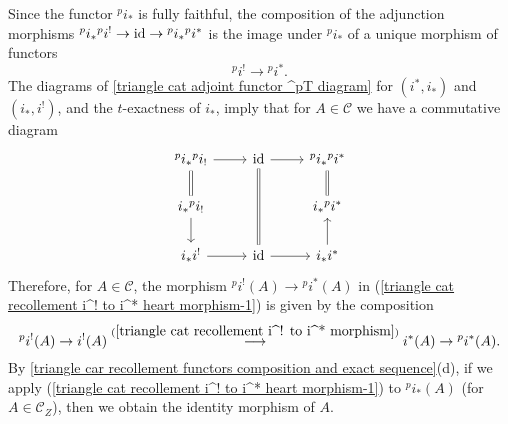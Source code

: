 Since the functor ${^pi_*}$ is fully faithful, the composition of the adjunction morphisms ${^pi_*}{^pi^!}\to\operatorname{id}\to{^pi_*}{^pi^*}$ is the image under ${^pi_*}$ of a unique morphism of functors
\begin{equation}\label{triangle cat recollement i^! to i^* heart morphism-1}
{^pi^!}\to{^pi^*}.
\end{equation}
The diagrams of \cref{triangle cat adjoint functor ^pT diagram} for $(i^*,i_*)$ and $(i_*,i^!)$, and the $t$-exactness of $i_*$, imply that for $A\in\mathcal{C}$ we have a commutative diagram
\[\begin{tikzcd}
{^pi_*}{^pi_!}\ar[r]\ar[d,equal]&\id\ar[dd,equal]\ar[r]&{^pi_*}{^pi^*}\ar[d,equal]\\
i_*{^pi_!}\ar[d]&&i_*{^pi^*}\\
i_*i^!\ar[r]&\id\ar[r]&i_*i^*\ar[u]
\end{tikzcd}\]
Therefore, for $A\in\mathcal{C}$, the morphism ${^pi^!}(A)\to {^pi^*}(A)$ in (\ref{triangle cat recollement i^! to i^* heart morphism-1}) is given by the composition
\begin{equation}\label{triangle cat recollement i^! to i^* heart morphism-2}
{^pi^!}(A)\to i^!(A)\stackrel{(\ref{triangle cat recollement i^! to i^* morphism})}{\longrightarrow} i^*(A)\to {^pi^*}(A).
\end{equation}
By \cref{triangle car recollement functors composition and exact sequence}(d), if we apply (\ref{triangle cat recollement i^! to i^* heart morphism-1}) to ${^pi_*}(A)$ (for $A\in\mathcal{C}_Z$), then we obtain the identity morphism of $A$.\par

